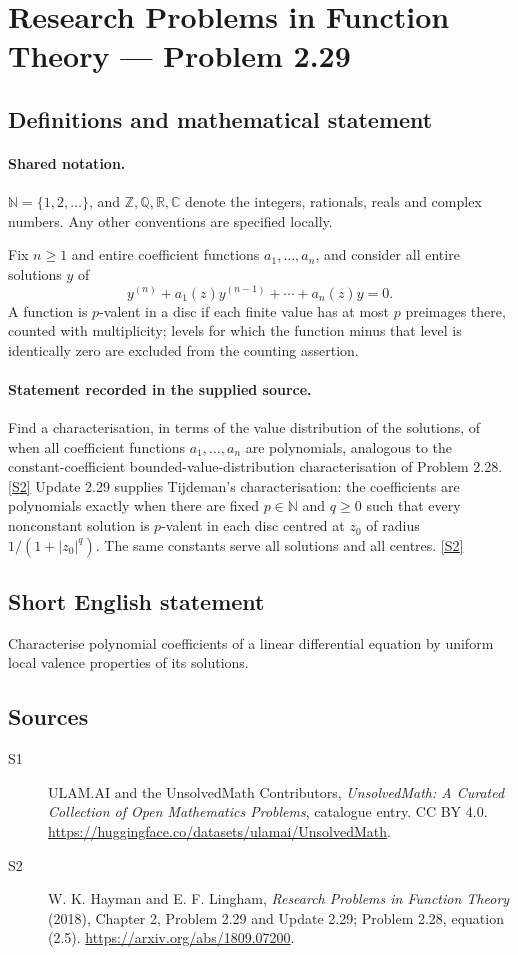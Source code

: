 \documentclass[11pt]{article}
\newcommand{\sref}[2]{\hyperlink{source:#1:#2}{[S#2]}}
\begin{document}
\section{Research Problems in Function Theory — Problem 2.29}\label{statement}

\subsection{Definitions and mathematical statement}

\paragraph{Shared notation.}$\mathbb N=\{1,2,\ldots\}$, and $\mathbb Z,\mathbb Q,\mathbb R,\mathbb C$ denote the integers, rationals, reals and complex numbers. Any other conventions are specified locally.


Fix $n\ge1$ and entire coefficient functions $a_1,\ldots,a_n$, and consider all entire solutions $y$ of
\[y^{(n)}+a_1(z)y^{(n-1)}+\cdots+a_n(z)y=0.\]
A function is $p$-valent in a disc if each finite value has at most $p$ preimages there, counted with multiplicity; levels for which the function minus that level is identically zero are excluded from the counting assertion.

\paragraph{Statement recorded in the supplied source.}
Find a characterisation, in terms of the value distribution of the solutions, of when all coefficient functions $a_1,\ldots,a_n$ are polynomials, analogous to the constant-coefficient bounded-value-distribution characterisation of Problem 2.28. \sref{statement}{2}
Update 2.29 supplies Tijdeman's characterisation: the coefficients are polynomials exactly when there are fixed $p\in\mathbb N$ and $q\ge0$ such that every nonconstant solution is $p$-valent in each disc centred at $z_0$ of radius $1/(1+|z_0|^q)$. The same constants serve all solutions and all centres. \sref{statement}{2}
\subsection{Short English statement}
Characterise polynomial coefficients of a linear differential equation by uniform local valence properties of its solutions.
\subsection{Sources}
\begin{description}
\item[\hypertarget{source:statement:1}{S1}] ULAM.AI and the UnsolvedMath Contributors, \emph{UnsolvedMath: A Curated Collection of Open Mathematics Problems}, catalogue entry. CC BY 4.0. \url{https://huggingface.co/datasets/ulamai/UnsolvedMath}.
\item[\hypertarget{source:statement:2}{S2}] W. K. Hayman and E. F. Lingham, \emph{Research Problems in Function Theory} (2018), Chapter 2, Problem 2.29 and Update 2.29; Problem 2.28, equation (2.5). \url{https://arxiv.org/abs/1809.07200}.
\end{description}
\label{end:statement}
\end{document}
